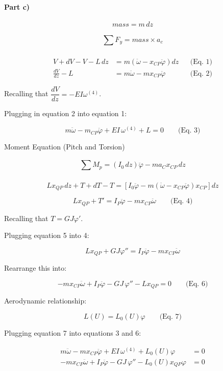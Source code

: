 \documentclass[11pt]{article}
\begin{document}
\paragraph{Part c)}\label{part-c}

\[
mass = m\,dz
\]

\[
\sum_{}^{}F_{y} = mass \times a_{c}
\]

\begin{align}
V + dV - V - L\,dz &= m\left( \ddot{\omega} - x_{CP}\ddot{\varphi} \right)dz &&\text{(Eq. 1)}\\
\frac{dV}{dz} - L &= m\ddot{\omega} - m x_{CP}\ddot{\varphi} &&\text{(Eq. 2)}
\end{align}

Recalling that \(\dfrac{dV}{dz} = - EI\omega^{(4)}\).

Plugging in equation 2 into equation 1:

\[
m\ddot{\omega} - m_{CP}\ddot{\varphi} + EI\,\omega^{(4)} + L = 0 \qquad \text{(Eq. 3)}
\]

Moment Equation (Pitch and Torsion)

\[
\sum_{}^{}M_{p} = \left( I_{0}\,dz \right)\ddot{\varphi}
- m a_{C} x_{CP}\,dz
\]

\[
L x_{QP}\,dz + T + dT - T
= \left[ I_{0}\ddot{\varphi} - m\left( \ddot{\omega} - x_{CP}\ddot{\varphi} \right)x_{CP} \right] dz
\]

\[
L x_{QP} + T' = I_{P}\ddot{\varphi} - m x_{CP}\ddot{\omega} \qquad \text{(Eq. 4)}
\]

Recalling that \(T = GJ\varphi'\).

Plugging equation 5 into 4:

\[
L x_{QP} + GJ\varphi'' = I_{P}\ddot{\varphi} - m x_{CP}\ddot{\omega}
\]

Rearrange this into:

\[
 - m x_{CP}\ddot{\omega} + I_{P}\ddot{\varphi} - GJ\,\varphi'' - L x_{QP} = 0 \qquad \text{(Eq. 6)}
\]

Aerodynamic relationship:

\[
L(U) = L_{0}(U)\varphi \qquad \text{(Eq. 7)}
\]

Plugging equation 7 into equations 3 and 6:

\begin{align}
m\ddot{\omega} - m x_{CP}\ddot{\varphi} + EI\,\omega^{(4)} + L_{0}(U)\varphi &= 0 \\
- m x_{CP}\ddot{\omega} + I_{P}\ddot{\varphi} - GJ\,\varphi'' - L_{0}(U)x_{QP}\varphi &= 0
\end{align}
\noindent\hfill{}
\end{document}
